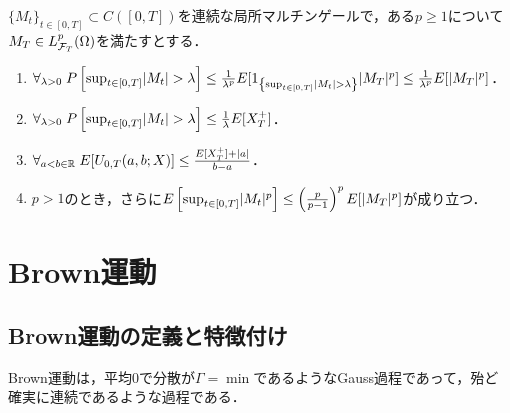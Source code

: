 \documentclass[uplatex,dvipdfmx]{jsreport}
\begin{document}
\begin{theorem}\label{thm-Doob-maximal-inequality}
    $\{M_t\}_{t\in[0,T]}\subset C([0,T])$を連続な局所マルチンゲールで，ある$p\ge1$について$M_T\in L^p_{\mathcal{F}_T}(\Omega)$を満たすとする．
    \begin{enumerate}
        \item $\forall_{\lambda>0}\;P\left[\sup_{t\in[0,T]}\lvert M_t\rvert>\lambda\right]\le\frac{1}{\lambda^p}E[1_{\left\{\sup_{t\in[0,T]}\lvert M_t\rvert>\lambda\right\}}\lvert M_T\rvert^p]\le\frac{1}{\lambda^p}E[\lvert M_T\rvert^p]$．
        \item $\forall_{\lambda>0}\;P\left[\sup_{t\in[0,T]}\lvert M_t\rvert>\lambda\right]\le\frac{1}{\lambda}E[X^+_T]$．
        \item $\forall_{a<b\in\mathbb{R}}\;E[U_{0,T}(a,b;X)]\le\frac{E[X^+_T]+\lvert a\rvert}{b-a}$．
        \item $p>1$のとき，さらに$E\left[\sup_{t\in[0,T]}\lvert M_t\rvert^p\right]\le\left(\frac{p}{p-1}\right)^pE[\lvert M_T\rvert^p]$が成り立つ．
    \end{enumerate}
\end{theorem}



\chapter{Brown運動}

\section{Brown運動の定義と特徴付け}

\begin{tcolorbox}[colframe=ForestGreen, colback=ForestGreen!10!white,breakable,colbacktitle=ForestGreen!40!white,coltitle=black,fonttitle=\bfseries\sffamily,
title=]
    Brown運動は，平均$0$で分散が$\Gamma=\min$であるようなGauss過程であって，殆ど確実に連続であるような過程である．
\end{tcolorbox}
\end{document}
